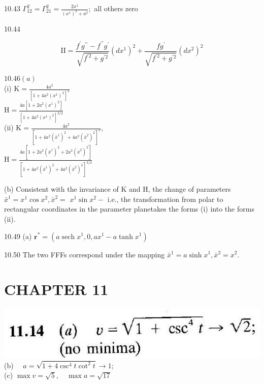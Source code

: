 \documentclass[10pt]{article}
\begin{document}
10.43 $\Gamma_{12}^{2}=\Gamma_{21}^{2}=\frac{2 x^{1}}{\left(x^{1}\right)^{2}+a^{2}} ;$ all others zero

10.44

$$
\mathrm{II}=\frac{f^{\prime} g^{\prime \prime}-f^{\prime \prime} g^{\prime}}{\sqrt{f^{\prime 2}+g^{\prime 2}}}\left(d x^{1}\right)^{2}+\frac{f g^{\prime}}{\sqrt{f^{\prime 2}+g^{\prime 2}}}\left(d x^{2}\right)^{2}
$$

$10.46(a)$\\
(i) $\mathrm{K}=\frac{4 a^{2}}{\left[1+4 a^{2}\left(x^{1}\right)^{2}\right]^{2}}$\\
$\mathrm{H}=\frac{4 a\left[1+2 a^{2}\left(x^{1}\right)^{2}\right]}{\left[1+4 a^{2}\left(x^{1}\right)^{2}\right]^{3 / 2}}$\\
(ii) $\mathrm{K}=\frac{4 a^{2}}{\left[1+4 a^{2}\left(\bar{x}^{1}\right)^{2}+4 a^{2}\left(\bar{x}^{2}\right)^{2}\right]^{2}}$,\\
$\mathrm{H}=\frac{4 a\left[1+2 a^{2}\left(\bar{x}^{1}\right)^{2}+2 a^{2}\left(\bar{x}^{2}\right)^{2}\right]}{\left[1+4 a^{2}\left(\bar{x}^{1}\right)^{2}+4 a^{2}\left(\bar{x}^{2}\right)^{2}\right]^{3 / 2}}$

(b) Consistent with the invariance of $\mathrm{K}$ and $\mathrm{H}$, the change of parameters $\bar{x}^{1}=x^{1} \cos x^{2}, \bar{x}^{2}=$ $x^{1} \sin x^{2}-$ i.e., the transformation from polar to rectangular coordinates in the parameter planetakes the forms (i) into the forms (ii).

10.49 (a) $\mathbf{r}^{*}=\left(a \operatorname{sech} x^{1}, 0, a x^{1}-a \tanh x^{1}\right)$

10.50 The two FFFs correspond under the mapping $\bar{x}^{1}=a \sinh x^{1}, \bar{x}^{2}=x^{2}$.

\section*{CHAPTER 11}
\includegraphics[max width=\textwidth, center]{2024_04_03_41f90be4f896e21f0dc9g-229}\\
(b) $\quad a=\sqrt{1+4 \csc ^{4} t \cot ^{2} t} \rightarrow 1$;\\
(c) $\max v=\sqrt{5}, \quad \max a=\sqrt{17}$
\end{document}
